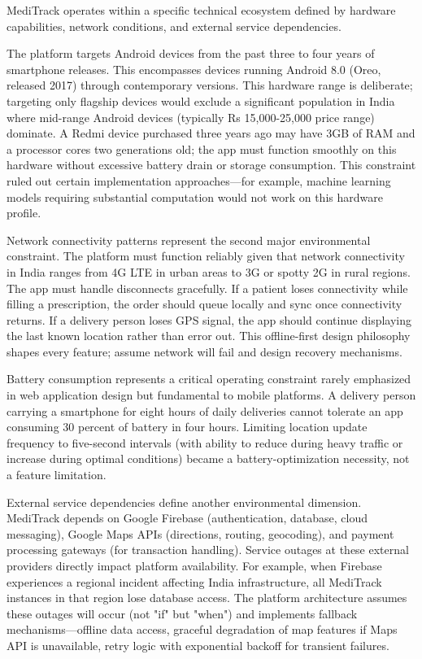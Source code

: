 \documentclass[12pt,a4paper]{report}
\begin{document}
MediTrack operates within a specific technical ecosystem defined by hardware capabilities, network conditions, and external service dependencies.

The platform targets Android devices from the past three to four years of smartphone releases. This encompasses devices running Android 8.0 (Oreo, released 2017) through contemporary versions. This hardware range is deliberate; targeting only flagship devices would exclude a significant population in India where mid-range Android devices (typically Rs 15,000-25,000 price range) dominate. A Redmi device purchased three years ago may have 3GB of RAM and a processor cores two generations old; the app must function smoothly on this hardware without excessive battery drain or storage consumption. This constraint ruled out certain implementation approaches—for example, machine learning models requiring substantial computation would not work on this hardware profile.

Network connectivity patterns represent the second major environmental constraint. The platform must function reliably given that network connectivity in India ranges from 4G LTE in urban areas to 3G or spotty 2G in rural regions. The app must handle disconnects gracefully. If a patient loses connectivity while filling a prescription, the order should queue locally and sync once connectivity returns. If a delivery person loses GPS signal, the app should continue displaying the last known location rather than error out. This offline-first design philosophy shapes every feature; assume network will fail and design recovery mechanisms.

Battery consumption represents a critical operating constraint rarely emphasized in web application design but fundamental to mobile platforms. A delivery person carrying a smartphone for eight hours of daily deliveries cannot tolerate an app consuming 30 percent of battery in four hours. Limiting location update frequency to five-second intervals (with ability to reduce during heavy traffic or increase during optimal conditions) became a battery-optimization necessity, not a feature limitation.

External service dependencies define another environmental dimension. MediTrack depends on Google Firebase (authentication, database, cloud messaging), Google Maps APIs (directions, routing, geocoding), and payment processing gateways (for transaction handling). Service outages at these external providers directly impact platform availability. For example, when Firebase experiences a regional incident affecting India infrastructure, all MediTrack instances in that region lose database access. The platform architecture assumes these outages will occur (not "if" but "when") and implements fallback mechanisms—offline data access, graceful degradation of map features if Maps API is unavailable, retry logic with exponential backoff for transient failures.
\end{document}
